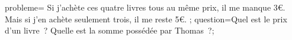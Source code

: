 \documentclass[exercice]{thedocument}%
\begin{document}
%
    \>probleme={%
    Si j'achète ces quatre livres tous au même prix, il me manque
    3\euro. Mais si j'en achète seulement trois, il me reste 5\euro.
    };%
    \>question=Quel est le prix d'un livre~? Quelle est la somme possédée par Thomas~?;%
\end{document}
